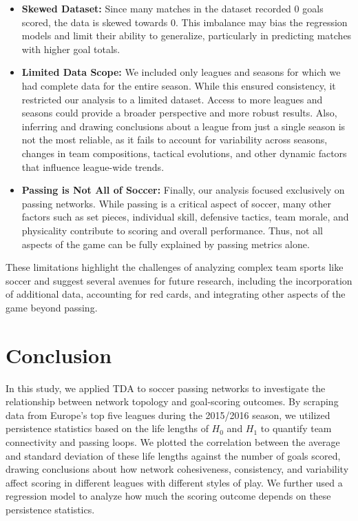 \documentclass[10pt,twocolumn]{article}
\begin{document}
\begin{itemize}
    \item \textbf{Skewed Dataset:} Since many matches in the dataset recorded $0$ goals scored, the data is skewed towards $0$. This imbalance may bias the regression models and limit their ability to generalize, particularly in predicting matches with higher goal totals.
    
    \item \textbf{Limited Data Scope:} We included only leagues and seasons for which we had complete data for the entire season. While this ensured consistency, it restricted our analysis to a limited dataset. Access to more leagues and seasons could provide a broader perspective and more robust results. Also, inferring and drawing conclusions about a league from just a single season is not the most reliable, as it fails to account for variability across seasons, changes in team compositions, tactical evolutions, and other dynamic factors that influence league-wide trends. 
    
    \item \textbf{Passing is Not All of Soccer:} Finally, our analysis focused exclusively on passing networks. While passing is a critical aspect of soccer, many other factors such as set pieces, individual skill, defensive tactics, team morale, and physicality contribute to scoring and overall performance. Thus, not all aspects of the game can be fully explained by passing metrics alone.
\end{itemize}

These limitations highlight the challenges of analyzing complex team sports like soccer and suggest several avenues for future research, including the incorporation of additional data, accounting for red cards, and integrating other aspects of the game beyond passing.

\section*{Conclusion}

In this study, we applied TDA to soccer passing networks to investigate the relationship between network topology and goal-scoring outcomes. By scraping data from Europe’s top five leagues during the 2015/2016 season, we utilized persistence statistics based on the life lengths of $ H_0 $ and $ H_1 $ to quantify team connectivity and passing loops. We plotted the correlation between the average and standard deviation of these life lengths against the number of goals scored, drawing conclusions about how network cohesiveness, consistency, and variability affect scoring in different leagues with different styles of play. We further used a regression model to analyze how much the scoring outcome depends on these persistence statistics. 
\end{document}
